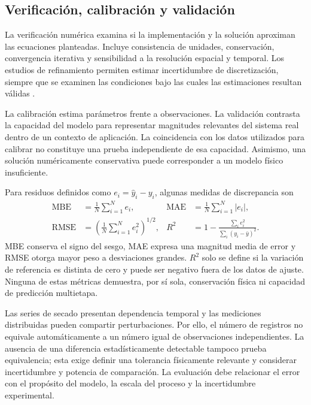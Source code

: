 \subsection{Verificación, calibración y validación}

La verificación numérica examina si la implementación y la solución aproximan las ecuaciones planteadas. Incluye consistencia de unidades, conservación, convergencia iterativa y sensibilidad a la resolución espacial y temporal. Los estudios de refinamiento permiten estimar incertidumbre de discretización, siempre que se examinen las condiciones bajo las cuales las estimaciones resultan válidas \cite{celik2008}.

La calibración estima parámetros frente a observaciones. La validación contrasta la capacidad del modelo para representar magnitudes relevantes del sistema real dentro de un contexto de aplicación. La coincidencia con los datos utilizados para calibrar no constituye una prueba independiente de esa capacidad. Asimismo, una solución numéricamente conservativa puede corresponder a un modelo físico insuficiente.

Para residuos definidos como $e_i=\hat y_i-y_i$, algunas medidas de discrepancia son
\begin{align}
\mathrm{MBE}&=\frac1N\sum_{i=1}^Ne_i,
&\mathrm{MAE}&=\frac1N\sum_{i=1}^N|e_i|,
\label{eq:metricas_sesgo_mae}\\
\mathrm{RMSE}&=\left(\frac1N\sum_{i=1}^Ne_i^2\right)^{1/2},
&R^2&=1-\frac{\sum_i e_i^2}{\sum_i(y_i-\bar y)^2}.
\label{eq:metricas_rmse_r2}
\end{align}
MBE conserva el signo del sesgo, MAE expresa una magnitud media de error y RMSE otorga mayor peso a desviaciones grandes. $R^2$ solo se define si la variación de referencia es distinta de cero y puede ser negativo fuera de los datos de ajuste. Ninguna de estas métricas demuestra, por sí sola, conservación física ni capacidad de predicción multietapa.

Las series de secado presentan dependencia temporal y las mediciones distribuidas pueden compartir perturbaciones. Por ello, el número de registros no equivale automáticamente a un número igual de observaciones independientes. La ausencia de una diferencia estadísticamente detectable tampoco prueba equivalencia; esta exige definir una tolerancia físicamente relevante y considerar incertidumbre y potencia de comparación. La evaluación debe relacionar el error con el propósito del modelo, la escala del proceso y la incertidumbre experimental.

